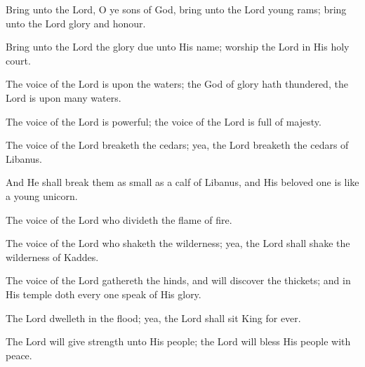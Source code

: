 Bring unto the Lord, O ye sons of God, bring unto the Lord young rams; bring unto the Lord glory and honour.

Bring unto the Lord the glory due unto His name; worship the Lord in His holy court.

The voice of the Lord is upon the waters; the God of glory hath thundered, the Lord is upon many waters.

The voice of the Lord is powerful; the voice of the Lord is full of majesty.

The voice of the Lord breaketh the cedars; yea, the Lord breaketh the cedars of Libanus.

And He shall break them as small as a calf of Libanus, and His beloved one is like a young unicorn.

The voice of the Lord who divideth the flame of fire.

The voice of the Lord who shaketh the wilderness; yea, the Lord shall shake the wilderness of Kaddes.

The voice of the Lord gathereth the hinds, and will discover the thickets; and in His temple doth every one speak of His glory.

The Lord dwelleth in the flood; yea, the Lord shall sit King for ever.

The Lord will give strength unto His people; the Lord will bless His people with peace.
